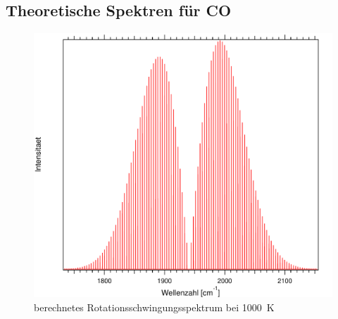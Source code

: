 \subsection*{Theoretische Spektren für CO}
\begin{figure}[H]
\centering	
	\begin{minipage}{0.8\linewidth}
	\includegraphics[width=\linewidth]{Bilder/1000CO.pdf}
	\caption{berechnetes Rotationsschwingungsspektrum bei 1000~K}
	\label{Rot:1000CO}
	\end{minipage}

	
	
	
	
\end{figure}

